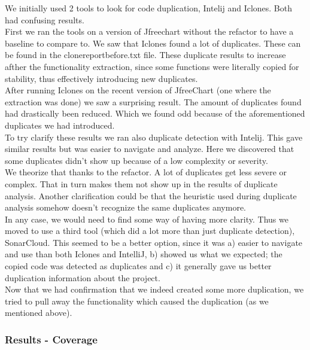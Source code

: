 \documentclass{article}
\begin{document}
We initially used 2 tools to look for code duplication, Intelij and Iclones. Both had confusing results.\\

First we ran the tools on a version of Jfreechart without the refactor to have a baseline to compare to. We saw that Iclones found a lot of duplicates. These can be found in the clonereportbefore.txt file. These duplicate results to increase afther the functionality extraction, since some functions were literally copied for stability, thus effectively introducing new duplicates.\\

After running Iclones on the recent version of JfreeChart (one where the extraction was done) we saw a surprising result. The amount of duplicates found had drastically been reduced. Which we found odd because of the aforementioned duplicates we had introduced.\\

To try clarify these results we ran also duplicate detection with Intelij. This gave similar results but was easier to navigate and analyze. Here we discovered that some duplicates didn't show up because of a low complexity or severity.\\

We theorize that thanks to the refactor. A lot of duplicates get less severe or complex. That in turn makes them not show up in the results of duplicate analysis. Another clarification could be that the heuristic used during duplicate analysis somehow doesn't recognize the same duplicates anymore.\\

\noindent
In any case, we would need to find some way of having more clarity. Thus we moved to use a third tool (which did a lot more than just duplicate detection), SonarCloud. This seemed to be a better option, since it was a) easier to navigate and use than both Iclones and IntelliJ, b) showed us what we expected; the copied code was detected as duplicates and c) it generally gave us better duplication information about the project.\\

Now that we had confirmation that we indeed created some more duplication, we tried to pull away the functionality which caused the duplication (as we mentioned above).

\subsubsection{Results - Coverage}
\end{document}
